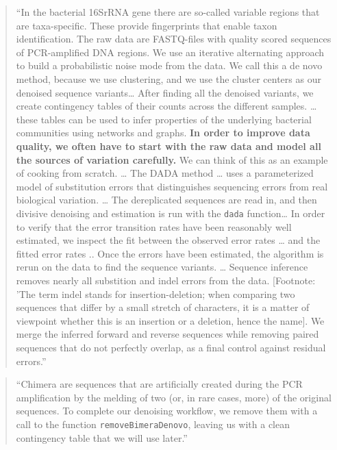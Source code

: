 \documentclass[]{tufte-book}
\begin{document}
\begin{quote}
``In the bacterial 16SrRNA gene there are so-called variable regions that are
taxa-specific. These provide fingerprints that enable taxon identification. The
raw data are FASTQ-files with quality scored sequences of PCR-amplified DNA
regions. We use an iterative alternating approach to build a probabilistic noise
mode from the data. We call this a de novo method, because we use clustering,
and we use the cluster centers as our denoised sequence variants\ldots{} After
finding all the denoised variants, we create contingency tables of their counts
across the different samples. \ldots{} these tables can be used to infer properties
of the underlying bacterial communities using networks and graphs. \textbf{In order to
improve data quality, we often have to start with the raw data and model all the
sources of variation carefully.} We can think of this as an example of cooking
from scratch. \ldots{} The DADA method \ldots{} uses a parameterized model of substitution
errors that distinguishes sequencing errors from real biological variation. \ldots{}
The dereplicated sequences are read in, and then divisive denoising and
estimation is run with the \texttt{dada} function\ldots{} In order to verify that the error
transition rates have been reasonably well estimated, we inspect the fit between
the observed error rates \ldots{} and the fitted error rates .. Once the errors have
been estimated, the algorithm is rerun on the data to find the sequence
variants. \ldots{} Sequence inference removes nearly all substition and indel errors
from the data. {[}Footnote: 'The term indel stands for insertion-deletion; when
comparing two sequences that differ by a small stretch of characters, it is a
matter of viewpoint whether this is an insertion or a deletion, hence the name{]}.
We merge the inferred forward and reverse sequences while removing paired
sequences that do not perfectly overlap, as a final control against residual
errors.'' \citep{holmes2018modern}
\end{quote}

\begin{quote}
``Chimera are sequences that are artificially created during the PCR
amplification by the melding of two (or, in rare cases, more) of the
original sequences. To complete our denoising workflow, we remove them
with a call to the function \texttt{removeBimeraDenovo}, leaving us with a
clean contingency table that we will use later.'' \citep{holmes2018modern}
\end{quote}
\end{document}
